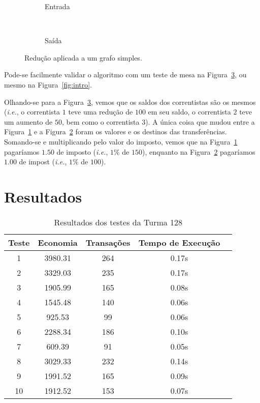 \documentclass[12pt]{article}
\begin{document}
\begin{figure}[H]
  \centering
  \begin{subfigure}[b]{0.5\textwidth}
    \begin{dot2tex}[neato,options=-tmath]
        
    \end{dot2tex}
    \caption{Entrada}
    \label{fig:reduce:abc:entrada}
  \end{subfigure}%
  ~
  \begin{subfigure}[b]{0.5\textwidth}
    \begin{dot2tex}[neato,options=-tmath]
        
    \end{dot2tex}
    \caption{Saída}
    \label{fig:reduce:abc:saida}
  \end{subfigure}
  \caption{Redução aplicada a um grafo simples.}
  \label{fig:reduce:abc}
\end{figure}

Pode-se facilmente validar o algoritmo com um teste de mesa na
Figura~\ref{fig:reduce:abc}, ou mesmo na Figura~\ref{fig:intro}.

Olhando-se para a Figura~\ref{fig:reduce:abc}, vemos que os saldos dos
correntistas são os mesmos (\textit{i.e.}, o correntista $1$ teve uma redução de
$100$ em seu saldo, o correntista $2$ teve um aumento de $50$, bem como o
correntista $3$). A única coisa que mudou entre a
Figura~\ref{fig:reduce:abc:entrada} e a Figura~\ref{fig:reduce:abc:saida} foram
os valores e os destinos das transferências. Somando-se e multiplicando pelo
valor do imposto, vemos que na Figura~\ref{fig:reduce:abc:entrada} pagaríamos
$1.50$ de imposto (\textit{i.e.}, $1\%$ de $150$), enquanto na
Figura~\ref{fig:reduce:abc:saida} pagaríamos $1.00$ de impost (\textit{i.e.},
$1\%$ de $100$).

\section{Resultados}\label{sec:resultados}

\begin{table}[H]
  \centering
\begin{tabular}{||c|c||c|c|c||}
  \hline
Teste & Economia & Transações & Tempo de Execução \\ [0.5ex]
  \hline\hline
  1 & 3980.31 & 264 & 0.17s \\
  \hline
  2 & 3329.03 & 235 & 0.17s \\
  \hline
  3 & 1905.99 & 165 & 0.08s \\
  \hline
  4 & 1545.48 & 140 & 0.06s \\
  \hline
  5 & 925.53  & 99 & 0.06s \\
  \hline
  6 & 2288.34 & 186 & 0.10s \\
  \hline
  7 & 609.39  & 91 & 0.05s \\
  \hline
  8 & 3029.33 & 232 & 0.14s \\
  \hline
  9 & 1991.52 & 165 & 0.09s \\
  \hline
  10 & 1912.52 & 153 & 0.07s \\
\hline
\end{tabular}

\label{tab:resultados}
\caption{Resultados dos testes da Turma 128}
\end{table}
\end{document}
